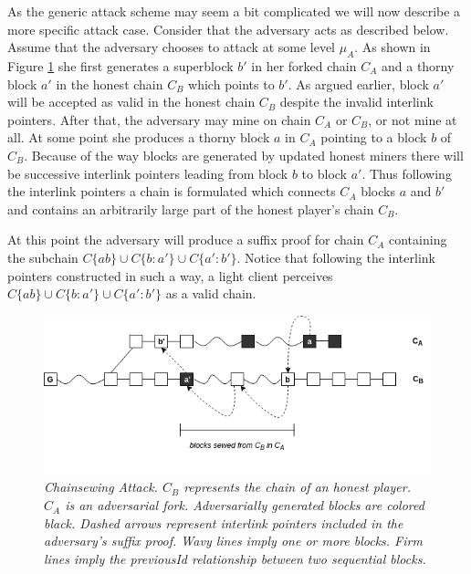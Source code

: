 As the generic attack scheme may seem a bit complicated we will now describe a more
specific attack case. Consider that the adversary acts as described below.
Assume that the adversary chooses to attack at some level $\mu_A$. As shown in
Figure \ref{fig:attack} she first generates a superblock $b'$ in her forked chain
$C_A$ and a thorny block $a'$ in the honest chain $C_B$ which points to $b'$. 
As argued earlier, block $a'$ will be accepted as valid in the honest chain $C_B$ 
despite the invalid interlink pointers. After that, the adversary may mine on chain
$C_A$ or $C_B$, or not mine at all. At some point she produces a thorny block $a$ 
in $C_A$ pointing to a block $b$ of $C_B$. Because of the way blocks are generated
by updated honest miners there will be successive interlink pointers leading
from block $b$ to block $a'$. Thus following the interlink pointers a chain is
formulated which connects $C_A$ blocks $a$ and $b'$ and contains an arbitrarily
large part of the honest player's chain $C_B$.

At this point the adversary will produce a suffix proof for chain $C_A$ containing
the subchain $C\{ab\} \cup C\{b:a'\} \cup C\{a':b'\}$. Notice that following the
interlink pointers constructed in such a way, a light client perceives $C\{ab\}
\cup C\{b:a'\} \cup C\{a':b'\}$  as a valid chain.

\begin{figure}[h!]
	\begin{center}
		\includegraphics[scale=0.55]{figures/chainsewing_attack.png}
	\end{center}
	\caption{\textit{Chainsewing Attack. $C_B$ represents the chain of an honest
	player. $C_A$ is an adversarial fork. Adversarially generated blocks are colored
	black. Dashed arrows represent	interlink pointers included in the adversary's
	suffix proof. Wavy lines imply one or more blocks. Firm lines imply the previousId 
	relationship between two sequential blocks.}}
	\label{fig:attack}
\end{figure}

